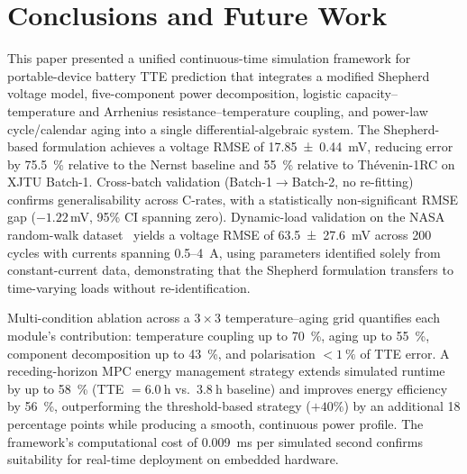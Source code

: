 \documentclass[5p,times,number]{elsarticle}
\begin{document}
\section{Conclusions and Future Work}\label{sec:conclusion}
This paper presented a unified continuous-time simulation framework for portable-device battery TTE prediction that integrates a modified Shepherd voltage model, five-component power decomposition, logistic capacity--temperature and Arrhenius resistance--temperature coupling, and power-law cycle/calendar aging into a single differential-algebraic system.
The Shepherd-based formulation achieves a voltage RMSE of \SI{17.85 \pm 0.44}{\milli\volt}, reducing error by \SI{75.5}{\percent} relative to the Nernst baseline and \SI{55}{\percent} relative to Th\'{e}venin-1RC on XJTU Batch-1.
Cross-batch validation (Batch-1$\to$Batch-2, no re-fitting) confirms generalisability across C-rates, with a statistically non-significant RMSE gap ($-1.22$\,mV, 95\% CI spanning zero).
Dynamic-load validation on the NASA random-walk dataset~\cite{Bole2014} yields a voltage RMSE of \SI{63.5 \pm 27.6}{\milli\volt} across 200 cycles with currents spanning 0.5--\SI{4}{\ampere}, using parameters identified solely from constant-current data, demonstrating that the Shepherd formulation transfers to time-varying loads without re-identification.

Multi-condition ablation across a $3 \times 3$ temperature--aging grid quantifies each module's contribution: temperature coupling up to \SI{70}{\percent}, aging up to \SI{55}{\percent}, component decomposition up to \SI{43}{\percent}, and polarisation $<\SI{1}{\percent}$ of TTE error.
A receding-horizon MPC energy management strategy extends simulated runtime by up to \SI{58}{\percent} (TTE $= \SI{6.0}{\hour}$ vs.\ $\SI{3.8}{\hour}$ baseline) and improves energy efficiency by \SI{56}{\percent}, outperforming the threshold-based strategy ($+40\%$) by an additional 18 percentage points while producing a smooth, continuous power profile.
The framework's computational cost of \SI{0.009}{\milli\second} per simulated second confirms suitability for real-time deployment on embedded hardware.
\end{document}
